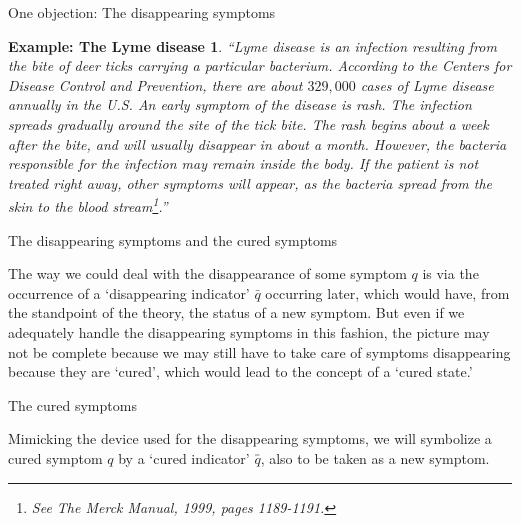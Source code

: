 \documentclass{beamer}
\newtheorem{examplelyme}[theorem]{Example: The Lyme disease}
\def\tl{\vskip 2mm}
\def\wl{\vskip 4mm}
\def\curedq{\overset{_=}{q}}
\def\curedq{\overset{_=}{q}}
\begin{document}
\begin{frame}{One objection: The disappearing symptoms}
\center
\begin{minipage}{10.5cm}

\begin{examplelyme}\sl\small ``Lyme disease is an infection resulting from the bite of deer ticks carrying a particular bacterium. According to the Centers for Disease Control and Prevention, there are about $329,000$ cases of Lyme disease annually in the U.S. 
\tl
An early symptom of the disease is rash. The infection spreads gradually around the site of the tick bite. The rash begins about a week after the bite, and will usually disappear in about a month. However, the bacteria responsible for the infection may remain inside the body. If the patient is not treated right away, other symptoms will appear, as the bacteria spread from the skin to the blood stream\footnote{See The Merck Manual, 1999, pages 1189-1191.}.''  
\end{examplelyme} 
\end{minipage}
\vspace{.5cm}

\end{frame}
\begin{frame}{The disappearing symptoms and the cured symptoms}

\center
\begin{minipage}{10.5cm}
The way we could  deal with the disappearance of some symptom $q$ is via the occurrence of a `disappearing indicator' $\bar q$ occurring later, which would have, from the standpoint of the theory,  the status of a new symptom.
\wl
But even if we adequately handle the disappearing symptoms in this fashion, the picture may not be complete because we may still have to take care of symptoms disappearing because they are  `{cured}', which would lead to the concept of a `{cured state}.' 
\end{minipage}
\vspace{.5cm}

\end{frame}
\begin{frame}{The cured symptoms}
\center
\begin{minipage}{10.5cm} Mimicking the device used for the disappearing symptoms, we will  symbolize a cured symptom $q$ by a `cured indicator' $\curedq$, also to be taken as a new symptom. 
\end{minipage}
\vspace{.5cm}

\end{frame}
\end{document}
